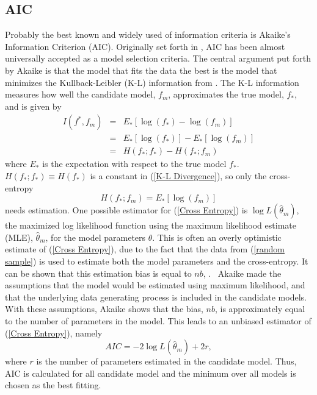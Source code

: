 \subsection{AIC}

Probably the best known and widely used of information criteria is
Akaike's Information Criterion (AIC). Originally set forth in \citet{Akaike:1974,Akaike:1973},
AIC has been almost universally accepted as a model selection criteria.
The central argument put forth by Akaike is that the model that fits
the data the best is the model that minimizes the Kullback-Leibler
(K-L) information from \citet{Kull:Leib:1951}. The K-L information
measures how well the candidate model, $f_{m}$, approximates the
true model, $f_{\ast}$, and is given by
\begin{eqnarray}
I\left(f^{\ast},f_{m}\right) & = & E_{\ast}\left[\log\left(f_{\ast}\right)-\log\left(f_{m}\right)\right]\label{K-L Divergence}\\
 & = & E_{\ast}\left[\log\left(f_{\ast}\right)\right]-E_{\ast}\left[\log\left(f_{m}\right)\right]\nonumber \\
 & = & H\left(f_{\ast};f_{\ast}\right)-H\left(f_{\ast};f_{m}\right)\nonumber 
\end{eqnarray}
where $E_{\ast}$ is the expectation with respect to the true model
$f_{\ast}$. $H\left(f_{\ast};f_{\ast}\right)\equiv H\left(f_{\ast}\right)$
is a constant in (\ref{K-L Divergence}), so only the cross-entropy
\begin{equation}
H\left(f_{\ast};f_{m}\right)=E_{\ast}\left[\log\left(f_{m}\right)\right]\label{Cross Entropy}
\end{equation}
needs estimation. One possible estimator for (\ref{Cross Entropy})
is $\log L\left(\hat{\theta}_{m}\right)$, the maximized log likelihood
function using the maximum likelihood estimate (MLE), $\hat{\theta}_{m}$,
for the model parameters $\theta$. This is often an overly optimistic
estimate of (\ref{Cross Entropy}), due to the fact that the data
from (\ref{random sample}) is used to estimate both the model parameters
and the cross-entropy. It can be shown that this estimation bias is
equal to $nb$, \citet{Koni:Kita:1996}. \ Akaike made the assumptions
that the model would be estimated using maximum likelihood, and that
the underlying data generating process is included in the candidate
models. With these assumptions, Akaike shows that the bias, $nb$,
is approximately equal to the number of parameters in the model. This
leads to an unbiased estimator of (\ref{Cross Entropy}), namely
\begin{equation}
AIC=-2\log L\left(\hat{\theta}_{m}\right)+2r,\label{AIC}
\end{equation}
where $r$ is the number of parameters estimated in the candidate
model. Thus, AIC is calculated for all candidate model and the minimum
over all models is chosen as the best fitting.


